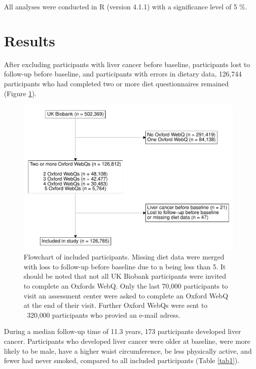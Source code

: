 \documentclass[sn-basic,Numbered,iicol,pdflatex]{sn-jnl}
\begin{document}
All analyses were conducted in R (version 4.1.1) with a significance
level of 5 \%.

\hypertarget{sec3}{%
\section{Results}\label{sec3}}

After excluding participants with liver cancer before baseline,
participants lost to follow-up before baseline, and participants with
errors in dietary data, 126,744 participants who had completed two or
more diet questionnaires remained (Figure \ref{fig:fig1}).

\begin{figure}

{\centering \includegraphics[width=0.75\linewidth,]{legliv_eur-j-nutr_files/figure-latex/fig1-1} 

}

\caption{Flowchart of included participants. Missing diet data were merged with loss to follow-up before baseline due to n being less than 5. It should be noted that not all UK Biobank participants were invited to complete an Oxfords WebQ. Only the last 70,000 participants to visit an assessment center were asked to complete an Oxford WebQ at the end of their visit. Further Oxford WebQs were sent to ~320,000 participants who provied an e-mail adress.}\label{fig:fig1}
\end{figure}

During a median follow-up time of 11.3 years, 173 participants developed
liver cancer. Participants who developed liver cancer were older at
baseline, were more likely to be male, have a higher waist
circumference, be less physically active, and fewer had never smoked,
compared to all included participants (Table \ref{tab1}).
\end{document}
